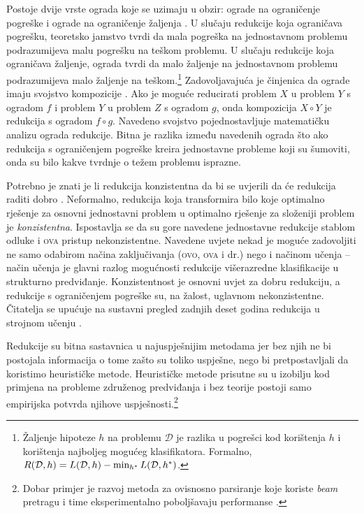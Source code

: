 Postoje dvije vrste ograda koje se uzimaju u obzir: ograde na ograničenje
pogreške  i ograde na ograničenje žaljenja . U slučaju redukcije koja ograničava pogrešku, teoretsko jamstvo tvrdi
da mala pogreška na jednostavnom problemu podrazumijeva malu pogrešku na teškom
problemu. U slučaju redukcije koja ograničava žaljenje, ograda tvrdi da malo
žaljenje na jednostavnom problemu podrazumijeva malo žaljenje na
teškom.\footnote{Žaljenje hipoteze $h$ na problemu $\mathcal{D}$ je razlika u
pogrešci kod korištenja $h$ i korištenja najboljeg mogućeg klasifikatora.
Formalno, $R(\mathcal{D}, h) = L(\mathcal{D}, h) - \min_{h\ssymbol{1}}
L(\mathcal{D}, h\ssymbol{1})$.} Zadovoljavajuća je činjenica da ograde imaju
svojstvo kompozicije \citep{beygelzimer2005error}. Ako je moguće reducirati
problem $X$ u problem $Y$ s ogradom $f$ i problem $Y$ u problem $Z$ s ogradom
$g$, onda kompozicija $X \circ Y$ je redukcija s ogradom $f \circ g$. Navedeno
svojstvo pojednostavljuje matematičku analizu ograda redukcije. Bitna je razlika
između navedenih ograda što ako redukcija s ograničenjem pogreške kreira
jednostavne probleme koji su šumoviti, onda su bilo kakve tvrdnje o težem
problemu isprazne.

Potrebno je znati je li redukcija konzistentna  da bi se
uvjerili da će redukcija raditi dobro \citep{beygelzimer2009error,
daume15reductions}. Neformalno, redukcija koja transformira bilo koje optimalno
rješenje za osnovni jednostavni problem u optimalno rješenje za složeniji
problem je \textit{konzistentna}. Ispostavlja se da su gore navedene jednostavne
redukcije stablom odluke i \textsc{ova} pristup nekonzistentne. Navedene uvjete
nekad je moguće zadovoljiti ne samo odabirom načina zaključivanja (\textsc{ovo},
\textsc{ova} i dr.) nego i načinom učenja \citep{abe2004iterative,
beygelzimer2005weighted} -- način učenja je glavni razlog mogućnosti redukcije
višerazredne klasifikacije u strukturno predviđanje. Konzistentnost je osnovni
uvjet za dobru redukciju, a redukcije s ograničenjem pogreške su, na žalost,
uglavnom nekonzistentne. Čitatelja se upućuje na sustavni pregled zadnjih deset
godina redukcija u strojnom učenju \citep{daume15reductions}.

Redukcije su bitna sastavnica u najuspješnijim \lts{} metodama jer bez njih ne
bi postojala informacija o tome zašto su toliko uspješne, nego bi
pretpostavljali da koristimo heurističke metode. Heurističke metode prisutne su
u izobilju kod primjena na probleme združenog predviđanja i bez teorije postoji
samo empirijska potvrda njihove uspješnosti.\footnote{Dobar primjer je razvoj
metoda za ovisnosno parsiranje koje koriste \textit{beam} pretragu i time
eksperimentalno poboljšavaju performanse \citep{zhang2011transition,
bohnet2012transition}.}

